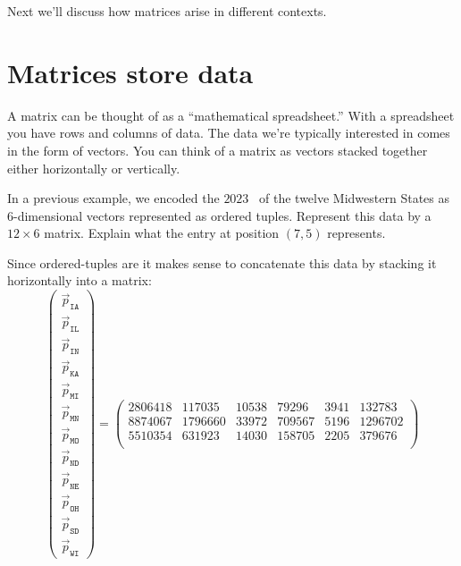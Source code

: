 \documentclass{ximera}
\begin{document}
Next we'll discuss how matrices arise in different contexts.


\section{Matrices store data}


A matrix can be thought of as a ``mathematical spreadsheet.'' With a
spreadsheet you have rows and columns of data.  The data we're
typically interested in comes in the form of vectors.  You can think
of a matrix as vectors stacked together either horizontally or
vertically.

\begin{example} %
  In a previous example, we encoded the $2023$
  ~of
  the twelve Midwestern States as $6$-dimensional vectors represented
  as ordered tuples. Represent this data by a $12\times 6$
  matrix. Explain what the entry at position $(7,5)$ represents.
  \begin{explanation}
    Since ordered-tuples are  it makes sense to
    concatenate this data by stacking it horizontally into a matrix:
    \[
      \begin{pmatrix}
        \vec{p}_{\texttt{IA}} \\
        \vec{p}_{\texttt{IL}} \\
        \vec{p}_{\texttt{IN}} \\
        \vec{p}_{\texttt{KA}} \\
        \vec{p}_{\texttt{MI}} \\
        \vec{p}_{\texttt{MN}} \\
        \vec{p}_{\texttt{MO}} \\
        \vec{p}_{\texttt{ND}} \\
        \vec{p}_{\texttt{NE}} \\
        \vec{p}_{\texttt{OH}} \\
        \vec{p}_{\texttt{SD}} \\
        \vec{p}_{\texttt{WI}}
      \end{pmatrix}
      =
      \begin{pmatrix}
        2806418 & 117035 & 10538 & 79296 & 3941 & 132783\\
        8874067 & 1796660 & 33972 & 709567 & 5196 & 1296702\\
        5510354 & 631923 & 14030 & 158705 & 2205 & 379676\\

\end{pmatrix}\]
\end{explanation}
\end{example}
\end{document}
